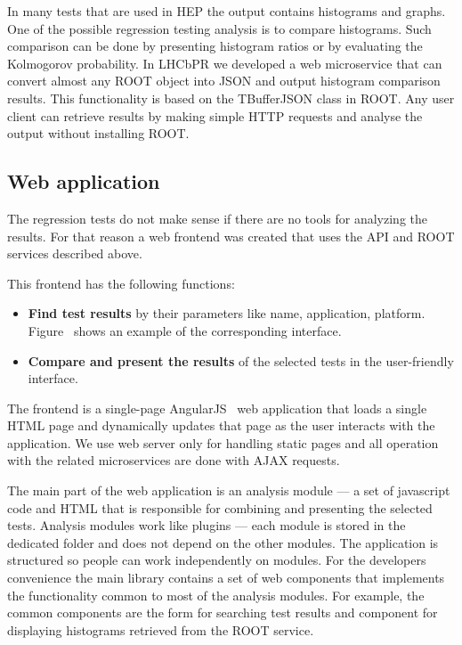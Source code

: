\documentclass[10pt]{iopart}
\begin{document}
In many tests that are used in HEP the output contains histograms and graphs.
One of the possible regression testing analysis is to compare histograms. Such
comparison can be done by presenting histogram ratios or by evaluating the
Kolmogorov probability. In LHCbPR we developed a web microservice that can
convert almost any ROOT object into JSON and output histogram comparison
results. This functionality is based on the TBufferJSON class in ROOT. Any user
client can retrieve results by making simple HTTP requests and analyse the
output without installing ROOT.


\subsection{Web application}\label{sec:webapp}

The regression tests do not make sense if there are no tools for analyzing the
results. For that reason a web frontend was created  that uses the API and
ROOT services described above.

This frontend has the following functions:
\begin{itemize}
\item \textbf{Find test results} by their parameters like name, application,
platform. Figure~ shows an example of the corresponding
interface.
\item \textbf{Compare and present the results} of the selected tests in the user-friendly interface.
\end{itemize}

The frontend is a single-page AngularJS~\cite{angular} web application that
loads a single HTML page and dynamically updates that page as the user interacts
with the application. We use web server only for handling static pages and all
operation with the related microservices are done with AJAX requests.

The main part of the web application is an analysis module --- a set of
javascript code and HTML that is responsible for combining and presenting the
selected tests. Analysis modules work like plugins --- each module is stored in
the dedicated folder and does not depend on the other modules. The application is
structured so people can work independently on modules. For the developers
convenience the main library contains a set of web components that implements
the functionality common to most of the analysis modules. For example, the
common components are the form for searching test results and component for
displaying histograms retrieved from the ROOT service.
\end{document}
